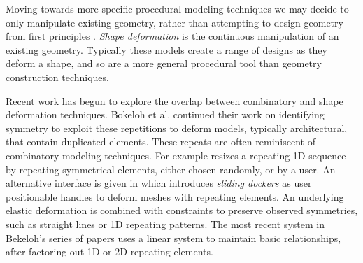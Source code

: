 Moving towards more specific procedural modeling techniques we may decide to only manipulate existing geometry, rather than attempting to design geometry from  first principles . \emph{Shape deformation} is the continuous manipulation of an existing geometry. Typically these models create a range of designs as they deform a shape, and so are a more general procedural tool than geometry construction techniques.

Recent work has begun to explore the overlap between combinatory and shape deformation techniques. Bokeloh et al. continued their work on identifying symmetry\cite{Bokeloh09} to exploit these repetitions to deform models, typically architectural, that contain duplicated elements. These repeats are often reminiscent of combinatory modeling techniques. For example \cite{Bokeloh10} resizes a repeating 1D sequence by repeating symmetrical elements, either chosen randomly, or by a user. An alternative interface is given in \cite{Bokeloh11} which introduces \emph{sliding dockers} as user positionable handles to deform meshes with repeating elements. An underlying elastic deformation is combined with constraints to preserve observed symmetries, such as straight lines or 1D repeating patterns. The most recent system in Bekeloh's series of papers \cite{Bokeloh12} uses a linear system to maintain basic relationships, after factoring out 1D or 2D repeating elements.




